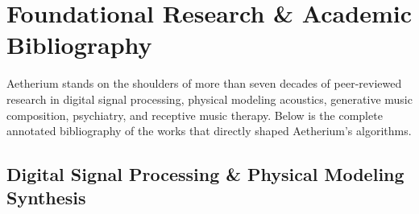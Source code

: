 \documentclass[11pt,oneside,openany]{book}
\begin{document}
\chapter[Research \& Bibliography]{Foundational Research \& Academic Bibliography}

Aetherium stands on the shoulders of more than seven decades of peer-reviewed research in digital signal processing, physical modeling acoustics, generative music composition, psychiatry, and receptive music therapy. Below is the complete annotated bibliography of the works that directly shaped Aetherium's algorithms.

\section{Digital Signal Processing \& Physical Modeling Synthesis}
\end{document}
